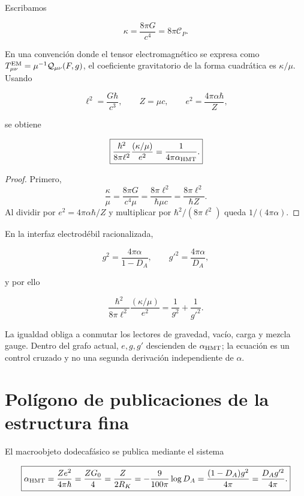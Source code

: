 Escribamos

\[
\kappa=\frac{8\pi G}{c^4}=8\pi\mathscr C_P.
\]

En una convenci\'on donde el tensor electromagn\'etico se expresa como
\(T_{\mu\nu}^{\rm EM}=\mu^{-1}\mathcal Q_{\mu\nu}(F,g)\), el coeficiente
gravitatorio de la forma cuadr\'atica es \(\kappa/\mu\). Usando

\[
\ell^2=\frac{G\hbar}{c^3},
\qquad
Z=\mu c,
\qquad
e^2=\frac{4\pi\alpha\hbar}{Z},
\]

se obtiene

\begin{equation}
\boxed{
\frac{\hbar^2}{8\pi\ell^2}
\frac{(\kappa/\mu)}{e^2}
=\frac{1}{4\pi\alpha_{\rm HMT}}.}
\label{eq:rm-einstein-maxwell-alpha}
\end{equation}

\begin{proof}
Primero,
\[
\frac{\kappa}{\mu}
=\frac{8\pi G}{c^4\mu}
=\frac{8\pi\ell^2}{\hbar\mu c}
=\frac{8\pi\ell^2}{\hbar Z}.
\]
Al dividir por \(e^2=4\pi\alpha\hbar/Z\) y multiplicar por
\(\hbar^2/(8\pi\ell^2)\) queda \(1/(4\pi\alpha)\).
\end{proof}

En la interfaz electrod\'ebil racionalizada,

\[
g^2=\frac{4\pi\alpha}{1-D_A},
\qquad
g'^2=\frac{4\pi\alpha}{D_A},
\]

y por ello

\begin{equation}
\boxed{
\frac{\hbar^2}{8\pi\ell^2}
\frac{(\kappa/\mu)}{e^2}
=\frac1{g^2}+\frac1{g'^2}.}
\label{eq:rm-cross-einstein-ew}
\end{equation}

La igualdad obliga a conmutar los lectores de gravedad, vac\'io, carga y
mezcla gauge. Dentro del grafo actual, \(e,g,g'\) descienden de
\(\alpha_{\rm HMT}\); la ecuaci\'on es un control cruzado y no una segunda
derivaci\'on independiente de \(\alpha\).

\section{Polígono de publicaciones de la estructura fina}

El macroobjeto dodecaf\'asico se publica mediante el sistema

\begin{equation}
\boxed{
\alpha_{\rm HMT}
=\frac{Ze^2}{4\pi\hbar}
=\frac{ZG_0}{4}
=\frac{Z}{2R_K}
=-\frac{9}{100\pi}\log D_A
=\frac{(1-D_A)g^2}{4\pi}
=\frac{D_Ag'^2}{4\pi}.}
\label{eq:rm-alpha-polygon}
\end{equation}

